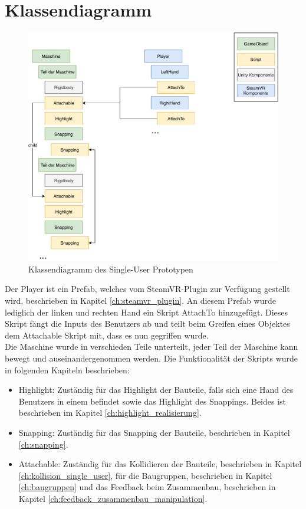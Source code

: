 \section{Klassendiagramm}
\label{ch:klassendiagram_single_user}

\begin{figure}[h!]
	\centering
	\includegraphics[keepaspectratio,width=0.75\linewidth]{img/Klassendiagramm_T1.pdf}
	\caption{Klassendiagramm des Single-User Prototypen}
	\label{fig:klassendiagramm_single_user}
\end{figure}

Der \grqq Player\grqq{} ist ein Prefab, welches vom SteamVR-Plugin zur Verfügung gestellt wird, beschrieben in Kapitel \ref{ch:steamvr_plugin}. An diesem Prefab wurde lediglich der linken und rechten Hand ein Skript \grqq AttachTo\grqq{} hinzugefügt. Dieses Skript fängt die Inputs des Benutzers ab und teilt beim Greifen eines Objektes dem \grqq Attachable\grqq{} Skript mit, dass es nun gegriffen wurde. \\

\noindent Die Maschine wurde in verschieden Teile unterteilt, jeder Teil der Maschine kann bewegt und auseinandergenommen werden. Die Funktionalität der Skripts wurde in folgenden Kapiteln beschrieben:

\begin{itemize} [itemsep=1pt,topsep=0pt]	
	\item Highlight: Zuständig für das Highlight der Bauteile, falls sich eine Hand des Benutzers in einem befindet sowie das Highlight des Snappings. Beides ist beschrieben im Kapitel \ref{ch:highlight_realisierung}.
	
	\item Snapping: Zuständig für das Snapping der Bauteile, beschrieben in Kapitel \ref{ch:snapping}.
	
	\item Attachable: Zuständig für das Kollidieren der Bauteile, beschrieben in Kapitel \ref{ch:kollision_single_user}, für die Baugruppen, beschrieben in Kapitel \ref{ch:baugruppen} und das Feedback beim Zusammenbau, beschrieben in Kapitel \ref{ch:feedback_zusammenbau_manipulation}.
\end{itemize}